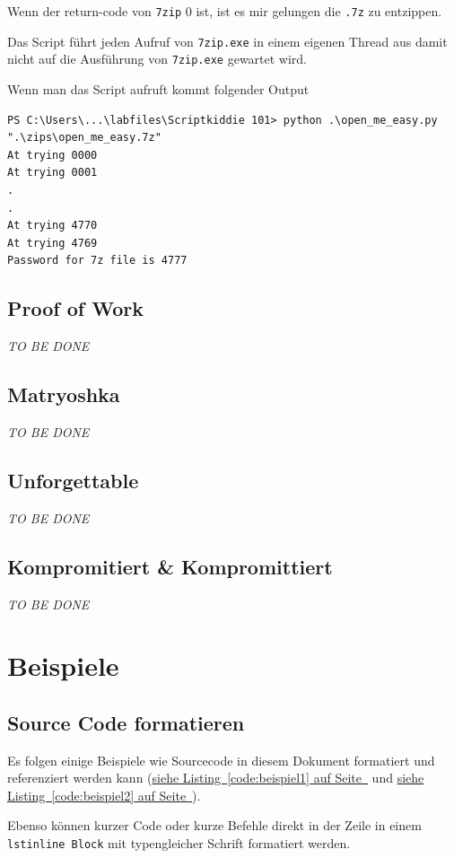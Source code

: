 \documentclass[12pt,a4paper,titlepage,oneside]{scrartcl}
\begin{document}
Wenn der return-code von \lstinline{7zip} 0 ist, ist es mir gelungen die \lstinline{.7z} zu entzippen.

Das Script führt jeden Aufruf von \lstinline{7zip.exe} in einem eigenen Thread aus damit nicht auf die Ausführung von \lstinline{7zip.exe} gewartet wird.

Wenn man das Script aufruft kommt folgender Output
\begin{lstlisting}
PS C:\Users\...\labfiles\Scriptkiddie 101> python .\open_me_easy.py ".\zips\open_me_easy.7z"
At trying 0000
At trying 0001
.
.
At trying 4770
At trying 4769
Password for 7z file is 4777 
\end{lstlisting}

\subsection{Proof of Work}
\emph{TO BE DONE}

\subsection{Matryoshka}
\emph{TO BE DONE}

\subsection{Unforgettable}
\emph{TO BE DONE}

\subsection{Kompromitiert \& Kompromittiert}
\emph{TO BE DONE}

\section{Beispiele}

\subsection{Source Code formatieren}
Es folgen einige Beispiele wie Sourcecode in diesem Dokument formatiert und referenziert werden kann
(\hyperref[code:beispiel1]{siehe Listing~\ref*{code:beispiel1} auf Seite~\pageref*{code:beispiel1}} und \hyperref[code:beispiel2]{siehe Listing~\ref*{code:beispiel2} auf Seite~\pageref*{code:beispiel2}}).

Ebenso können kurzer Code oder kurze Befehle direkt in der Zeile in einem \lstinline{lstinline Block} mit typengleicher Schrift formatiert werden.
\end{document}
